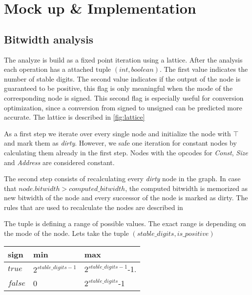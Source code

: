 \chapter{Mock up \& Implementation}\label{sec:impl}

\section{Bitwidth analysis}
The analyze is build as a fixed point iteration using a lattice. After the analysis each operation has a attached tuple $(int,boolean)$. The first value indicates the number of stable digits. The second value indicates if the output of the node is guaranteed to be positive, this flag is only meaningful when the mode of the corresponding node is signed. This second flag is especially useful for conversion optimization, since a conversion from signed to unsigned can be predicted more accurate.
The lattice is described in \ref{fig:lattice}


As a first step we iterate over every single node and initialize the node with $\top$ and mark them as \textit{dirty}. However, we safe one iteration for constant nodes by calculating them already in the first step. Nodes with the opcodes for \textit{Const}, \textit{Size} and \textit{Address} are considered constant.

The second step consists of recalculating every \textit{dirty} node in the graph. In case that $node.bitwidth > computed\_bitwidth$, the computed bitwidth is memorized as new bitwidth of the node and every successor of the node is marked as dirty. The rules that are used to recalculate the nodes are described in %

The tuple is defining a range of possible values. The exact range is depending on the mode of the node. Lets take the tuple $(stable\_digits,is\_positive)$
\begin{center}
	\begin{tabular}{| l | l | l |}
		\hline
		sign & min & max \\ \hline
		$true$ & $2^{stable\_digits-1}$ & $2^{stable\_digits-1}$-1. \\ \hline
		$false$ & 0 & $2^{stable\_digits}$-1 \\
		\hline
	\end{tabular}
\end{center}

